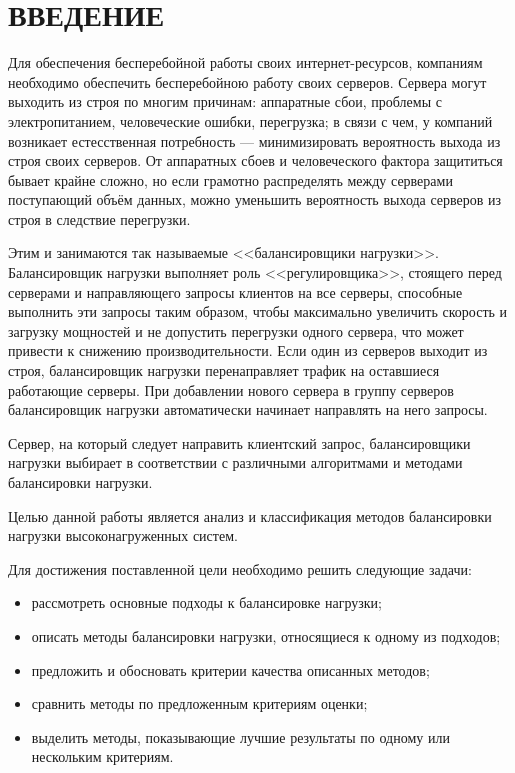 \section*{ВВЕДЕНИЕ}

Для обеспечения бесперебойной работы своих интернет-ресурсов, компаниям необходимо обеспечить бесперебойною работу своих серверов.
Сервера могут выходить из строя по многим причинам: аппаратные сбои, проблемы с электропитанием, человеческие ошибки, перегрузка; в связи с чем, у компаний возникает естесственная потребность --- минимизировать вероятность выхода из строя своих серверов.
От аппаратных сбоев и человеческого фактора защититься бывает крайне сложно, но если грамотно распределять между серверами поступающий объём данных, можно уменьшить вероятность выхода серверов из строя в следствие перегрузки.

Этим и занимаются так называемые <<балансировщики нагрузки>>.
Балансировщик нагрузки выполняет роль <<регулировщика>>, стоящего перед серверами и направляющего запросы клиентов на все серверы, способные выполнить эти запросы таким образом, чтобы максимально увеличить скорость и загрузку мощностей и не допустить перегрузки одного сервера, что может привести к снижению производительности.
Если один из серверов выходит из строя, балансировщик нагрузки перенаправляет трафик на оставшиеся работающие серверы.
При добавлении нового сервера в группу серверов балансировщик нагрузки автоматически начинает направлять на него запросы.~\cite{nginx}

Сервер, на который следует направить клиентский запрос, балансировщики нагрузки выбирает в соответствии с различными алгоритмами и методами балансировки нагрузки.

Целью данной работы является анализ и классификация методов балансировки нагрузки высоконагруженных систем.

Для достижения поставленной цели необходимо решить следующие задачи:
\begin{itemize}
    \item рассмотреть основные подходы к балансировке нагрузки;
    \item описать методы балансировки нагрузки, относящиеся к одному из подходов;
    \item предложить и обосновать критерии качества описанных методов;
    \item сравнить методы по предложенным критериям оценки;
    \item выделить методы, показывающие лучшие результаты по одному или нескольким критериям.
\end{itemize}
